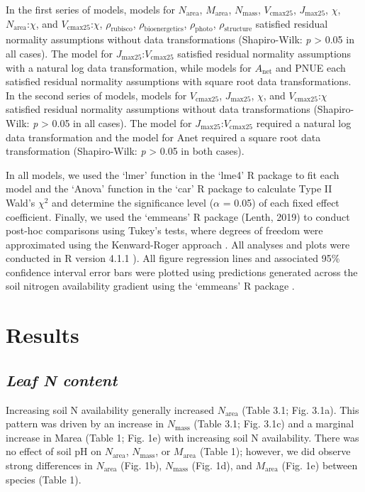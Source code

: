     In the first series of models, models for $N_\mathrm{area}$, $M_\mathrm{area}$, $N_\mathrm{mass}$, $V_\mathrm{cmax25}$, $J_\mathrm{max25}$, $\chi$, $N_{\mathrm{area}}$:$\chi$, and $V_{\mathrm{cmax25}}$:$\chi$, $\rho_\mathrm{rubisco}$, $\rho_\mathrm{bioenergetics}$, $\rho_\mathrm{photo}$, $\rho_\mathrm{structure}$ satisfied residual normality assumptions without data transformations (Shapiro-Wilk: \textit{p} > 0.05 in all cases). The model for $J_\mathrm{max25}$:$V_\mathrm{cmax25}$ satisfied residual normality assumptions with a natural log data transformation, while models for $A_\mathrm{net}$ and PNUE each satisfied residual normality assumptions with square root data transformations. In the second series of models, models for $V_\mathrm{cmax25}$, $J_\mathrm{max25}$, $\chi$, and $V_{\mathrm{cmax25}}$:$\chi$ satisfied residual normality assumptions without data transformations (Shapiro-Wilk: \textit{p} > 0.05 in all cases). The model for $J_\mathrm{max25}$:$V_\mathrm{cmax25}$ required a natural log data transformation and the model for Anet required a square root data transformation (Shapiro-Wilk: \textit{p} > 0.05 in both cases).
    
    In all models, we used the ‘lmer’ function in the ‘lme4’ R package  to fit each model and the ‘Anova’ function in the ‘car’ R package  to calculate Type II Wald’s $\chi\mathrm{^{2}}$ and determine the significance level ($\alpha$ = 0.05) of each fixed effect coefficient. Finally, we used the ‘emmeans’ R package (Lenth, 2019) to conduct post-hoc comparisons using Tukey’s tests, where degrees of freedom were approximated using the Kenward-Roger approach . All analyses and plots were conducted in R version 4.1.1 ). All figure regression lines and associated 95\% confidence interval error bars were plotted using predictions generated across the soil nitrogen availability gradient using the ‘emmeans’ R package .
    
    \section{Results}

    \subsection{\textit{Leaf N content}}
    
    Increasing soil N availability generally increased $N_\mathrm{area}$ (Table 3.1; Fig. 3.1a). This pattern was driven by an increase in $N_\mathrm{mass}$ (Table 3.1; Fig. 3.1c) and a marginal increase in Marea (Table 1; Fig. 1e) with increasing soil N availability. There was no effect of soil pH on $N_\mathrm{area}$, $N_\mathrm{mass}$, or $M_\mathrm{area}$ (Table 1); however, we did observe strong differences in $N_\mathrm{area}$ (Fig. 1b), $N_\mathrm{mass}$ (Fig. 1d), and $M_\mathrm{area}$ (Fig. 1e) between species (Table 1).
    \clearpage

